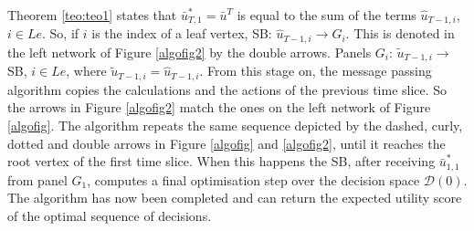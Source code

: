 \begin{example}
Theorem \ref{teo:teo1} states that $\bar{u}^*_{T,1}=\bar{u}^{T}$ is equal to the sum of the terms $\hat{u}_{T-1,i}$, $i\in Le$. So,  if $i$ is the index of a leaf vertex,  SB: $\hat{u}_{T-1,i}\longrightarrow G_i$. This is denoted in the left network of Figure \ref{algofig2} by the double arrows. Panels $G_i$: $\tilde{u}_{T-1,i}\longrightarrow$ SB, $i\in Le$, where $\tilde{u}_{T-1,i}=\hat{u}_{T-1,i}$. From this stage on, the message passing algorithm copies the calculations and the actions of the previous time slice. So the  arrows in Figure \ref{algofig2} match the ones on the left network of Figure \ref{algofig}. The algorithm  repeats the same sequence depicted by the  dashed, curly, dotted and double arrows in Figure \ref{algofig} and \ref{algofig2}, until it reaches the root vertex of the first time slice. When this happens  the SB, after receiving $\bar{u}^*_{1,1}$ from panel $G_1$, computes a final optimisation step over the decision space $\mathcal{D}(0)$. The algorithm has now been completed and can return  the expected utility score of the optimal sequence of decisions. 
\label{ex:algoex}
\end{example}

